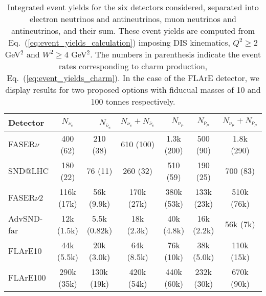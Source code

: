 \begin{table}[t]
  \centering
  \small
  \renewcommand{\arraystretch}{1.70}
\begin{tabularx}{\textwidth}{X||c|c|c||c|c|c}
\toprule
Detector & $\quad$ $N_{\nu_e}$ $\quad$ &$\quad$ $N_{\bar{\nu}_e}$$\quad$   &   $N_{\nu_e} + N_{\bar{\nu}_e}$ &
$\quad$$N_{\nu_\mu}$ $\quad$ & $\quad$ $N_{\bar{\nu}_\mu}$ $\quad$  &   $N_{\nu_\mu} + N_{\bar{\nu}_\mu}$ \\
\midrule
\midrule
FASER$\nu$  & 400 (62)    & 210 (38)  & 610 (100)  &  1.3k (200)  &  500 (90)  &  1.8k (290) \\
SND@LHC  &  180 (22)  & 76 (11)    & 260 (32)   &  510 (59) & 190 (25)   &  700  (83)\\
\midrule
\midrule
FASER$\nu$2  & 116k (17k)   & 56k (9.9k)   & 170k (27k)  & 380k (53k)  & 133k (23k)    & 510k (76k)   \\
AdvSND-far  &  12k (1.5k)  & 5.5k (0.82k)   & 18k (2.3k)  & 40k (4.8k)  & 16k (2.2k)   & 56k (7k)   \\
FLArE10 & 44k (5.5k) & 20k (3.0k)   &  64k (8.5k) &  76k (10k)&   38k (5.0k) &   110k (15k) \\
FLArE100 &   290k (35k)         &    130k (19k)         &       420k (54k)       &   440k (60k)      &  232k (30k)    &  670k (90k)  \\
  \bottomrule
\end{tabularx}
\vspace{0.2cm}
\caption{\small Integrated event yields for the six detectors considered,
  separated into electron neutrinos and antineutrinos,
  muon neutrinos and antineutrinos, and their sum.
  These event yields are computed from Eq.~(\ref{eq:event_yields_calculation})
  imposing DIS kinematics, $Q^2 \ge 2$ GeV$^2$ and $W^2 \ge 4$ GeV$^2$.
 The numbers in parenthesis indicate the event rates corresponding to charm
 production, Eq.~(\ref{eq:event_yields_charm}).
 In the case of the FLArE detector, we display results for two proposed
 options with fiducual masses of 10 and 100 tonnes respectively.
  \label{tab:integrated_rates}
}
\end{table}
